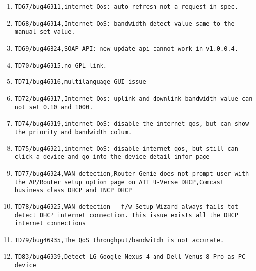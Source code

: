 \documentclass[12pt]{report}
\begin{document}
\begin{itemize}
\begin{enumerate}
		\item \texttt{TD67/bug46911,internet Qos: auto refresh not a request in spec.}
		\item \texttt{TD68/bug46914,Internet QoS: bandwidth detect value same to the manual set value.}
		\item \texttt{TD69/bug46824,SOAP API: new update api cannot work in v1.0.0.4.}
		\item \texttt{TD70/bug46915,no GPL link.}
		\item \texttt{TD71/bug46916,multilanguage GUI issue}
		\item \texttt{TD72/bug46917,Internet Qos: uplink and downlink bandwidth value can not set 0.10 and 1000.}
		\item \texttt{TD74/bug46919,internet QoS: disable the internet qos, but can show the priority and bandwidth colum.}
		\item \texttt{TD75/bug46921,internet QoS: disable internet qos, but still can click a device and go into the device detail infor page}
		\item \texttt{TD77/bug46924,WAN detection,Router Genie does not prompt user with the AP/Router setup option page on ATT U-Verse DHCP,Comcast business class DHCP and TNCP DHCP}
		\item \texttt{TD78/bug46925,WAN detection - f/w Setup Wizard always fails tot detect DHCP internet connection. This issue exists all the DHCP internet connections}
		\item \texttt{TD79/bug46935,The QoS throughput/bandwitdh is not accurate.}
		\item \texttt{TD83/bug46939,Detect LG Google Nexus 4 and Dell Venus 8 Pro as PC device}
    	\end{enumerate}
    \end{itemize}
\end{document}
